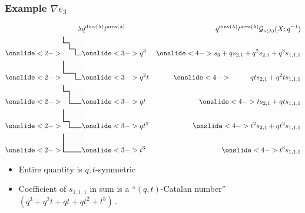\documentclass{beamer}
\DeclareMathOperator{\area}{area}
\DeclareMathOperator{\dinv}{dinv}
\newcommand{\Gcal}{\mathcal{G}}
\newcounter{c}
\begin{document}
\begin{frame}
  \frametitle{Example \(\nabla e_3\)}
  \vspace{-2em}
  \begin{eqnarray*}
    \lambda
    & q^{\dinv(\lambda)}t^{\area(\lambda)}
    & q^{\dinv(\lambda)}t^{\area(\lambda)}\Gcal_{\nu(\lambda)}(X;q^{-1})\\
      \onslide<2->{\begin{tikzpicture}[xscale = 0.3,yscale = 0.3]
      \draw[step=1cm,gray!20,very thin] (0,0) grid (3,3);
      \draw[step=1cm,gray!20,very thin] (0,3)--(3,0); \draw[thick]
      (0,3)--(0,2)--(1,2)--(1,1)--(2,1)--(2,0)--(3,0);
    \end{tikzpicture}}
    & \onslide<3->{q^3}
    & \onslide<4->{s_3+qs_{2,1}+q^2s_{2,1}+q^3s_{1,1,1}}\\
    \onslide<2->
    {
    \begin{tikzpicture}[xscale = 0.3,yscale = 0.3]
      \draw[step=1cm,gray!20,very thin] (0,0) grid (3,3);
      \draw[step=1cm,gray!20,very thin] (0,3)--(3,0); \draw[thick]
      (0,3)--(0,1)--(2,1)--(2,0)--(3,0);
    \end{tikzpicture}
    }
    & \onslide<3->{q^2t}
    & \onslide<4->{\phantom{ts_{2,1}+}qts_{2,1}+q^2ts_{1,1,1}}  \\
    \onslide<2->
    {
    \begin{tikzpicture}[xscale = 0.3,yscale = 0.3]
      \draw[step=1cm,gray!20,very thin] (0,0) grid (3,3);
      \draw[step=1cm,gray!20,very thin] (0,3)--(3,0); \draw[thick]
      (0,3)--(0,2)--(1,2)--(1,0)--(3,0);
    \end{tikzpicture}
    }
    & \onslide<3->{qt}
    & \onslide<4->{ts_{2,1}+qts_{1,1,1}}\\
    \onslide<2->
    {
    \begin{tikzpicture}[xscale = 0.3,yscale = 0.3]
      \draw[step=1cm,gray!20,very thin] (0,0) grid (3,3);
      \draw[step=1cm,gray!20,very thin] (0,3)--(3,0); \draw[thick]
      (0,3)--(0,1)--(1,1)--(1,0)--(3,0);
    \end{tikzpicture}
    }
    &\onslide<3->{qt^2}
    &\onslide<4->{ t^2 s_{2,1}+qt^2s_{1,1,1}}\\
    \onslide<2->
    {
    \begin{tikzpicture}[xscale = 0.3,yscale = 0.3]
      \draw[step=1cm,gray!20,very thin] (0,0) grid (3,3);
      \draw[step=1cm,gray!20,very thin] (0,3)--(3,0); \draw[thick]
      (0,3)--(0,0)--(3,0);
    \end{tikzpicture}
    }
    &\onslide<3->{t^3}
    & \onslide<4->{t^3s_{1,1,1}}
  \end{eqnarray*}
  \vspace{-0.75em}
  \begin{itemize}
  \item<5-> Entire quantity is \(q,t\)-symmetric
  \item<6-> Coefficient of \(s_{1,1,1}\) in sum is a ``\((q,t)\)-Catalan
    number'' \((q^3+q^2t+qt+qt^2+t^3)\)\,.
  \end{itemize}
\end{frame}
\end{document}
